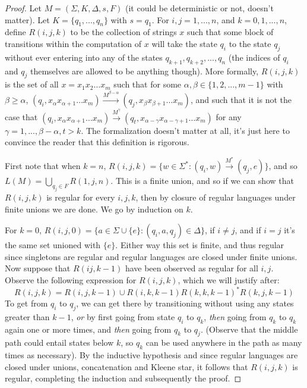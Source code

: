\documentclass{article}
\theoremstyle{definition}
\theoremstyle{plain}
\theoremstyle{theorem}
\begin{document}
\begin{proof}
	Let $M = (\Sigma,K,\Delta,s,F)$ (it could be deterministic or not, doesn't matter). Let $K = \{q_1,...,q_n\}$ with $s = q_1$. For $i,j = 1,...,n$, and $k=0,1,...,n$, define $R(i,j,k)$ to be the collection of strings $x$ such that some block of transitions within the computation of $x$ will take the state $q_i$ to the state $q_j$ without ever entering into any of the states $q_{k+1},q_{k+2},...,q_n$ (the indices of $q_i$ and $q_j$ themselves are allowed to be anything though). More formally, $R(i,j,k)$ is the set of all $x = x_1x_2\ldots x_m$ such that for some $\alpha,\beta \in \{1,2,...,m-1\}$ with $\beta \geq \alpha$, $(q_i,x_{\alpha}x_{\alpha+1}\ldots x_m) \overset{M^{\beta-\alpha}}{\to} (q_j,x_{\beta}x_{\beta+1}\ldots x_m)$, and such that it is not the case that $(q_i,x_{\alpha}x_{\alpha+1}\ldots x_m)\overset{M^{\gamma}}{\to} (q_t,x_{\alpha-\gamma}x_{\alpha-\gamma+1}\ldots x_m)$ for any $\gamma = 1,...,\beta-\alpha, t>k$. The formalization doesn't matter at all, it's just here to convince the reader that this definition is rigorous. \par 
	First note that when $k=n$, $R(i,j,k) = \{w \in \Sigma^*: (q_i,w) \overset{M^*}{\to} (q_j,e)\}$, and so $L(M) = \bigcup_{q_j \in F} R(1,j,n)$. This is a finite union, and so if we can show that $R(i,j,k)$ is regular for every $i,j,k$, then by closure of regular languages under finite unions we are done. We go by induction on $k$. \par 
	For $k=0$, $R(i,j,0) = \{a \in \Sigma \cup \{e\}: (q_i,a,q_j) \in \Delta \}$, if $i\neq j$, and if $i=j$ it's the same set unioned with $\{e\}$. Either way this set is finite, and thus regular since singletons are regular and regular languages are closed under finite unions. Now suppose that $R(ij,k-1)$ have been observed as regular for all $i,j$. Observe the following expression for $R(i,j,k)$, which we will justify after:
	\[R(i,j,k) = R(i,j,k-1) \cup R(i,k,k-1)R(k,k,k-1)^*R(k,j,k-1) \]
To get from $q_i$ to $q_j$, we can get there by transitioning without using any states greater than $k-1$, \textit{or} by first going from state $q_i$ to $q_k$, \textit{then} going from $q_k$ to $q_k$ again one or more times, and \textit{then} going from $q_k$ to $q_j$. (Observe that the middle path could entail states below $k$, so $q_k$ can be used anywhere in the path as many times as necessary). By the inductive hypothesis and since regular languages are closed under unions, concatenation and Kleene star, it follows that $R(i,j,k)$ is regular, completing the induction and subsequently the proof. 
\end{proof}
\end{document}
